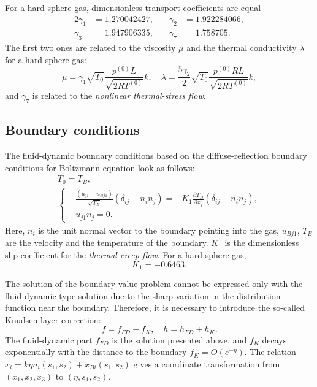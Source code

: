 \documentclass[smallextended, referee]{svjour3} %
\newcommand{\pder}[2][]{\frac{\partial#1}{\partial#2}}
\begin{document}
For a hard-sphere gas, dimensionless transport coefficients are equal
\begin{alignat*}{2}
	\gamma_1 &= 1.270042427, &\quad \gamma_2 &= 1.922284066, \\
	\gamma_3 &= 1.947906335, &\quad \gamma_7 &= 1.758705.
\end{alignat*}
The first two ones are related to the viscosity \(\mu\) and
the thermal conductivity \(\lambda\) for a hard-sphere gas:
\begin{equation}
	\mu = \gamma_1\sqrt{T_0} \frac{p^{(0)}L}{\sqrt{2RT^{(0)}}} k, \quad
	\lambda = \frac{5\gamma_2}{2}\sqrt{T_0} \frac{p^{(0)}RL}{\sqrt{2RT^{(0)}}} k,
\end{equation}	
and \(\gamma_7\) is related to the \emph{nonlinear thermal-stress flow}.

\subsection{Boundary conditions}

The fluid-dynamic boundary conditions based on the diffuse-reflection boundary conditions
for Boltzmann equation look as follows:
\begin{gather}
	T_0 = T_B, \label{eq:bound:T} \\
	\left\{
	\begin{aligned}
		& \frac{(u_{j1}-u_{Bj1})}{\sqrt{T_B}}(\delta_{ij}-n_in_j) = 
			-K_1\pder[T_B]{x_j}(\delta_{ij}-n_in_j), \\
		& u_{j1}n_j = 0.
	\end{aligned}
	\right. \label{eq:bound:v}
\end{gather}
Here, \(n_i\) is the unit normal vector to the boundary pointing into the gas,
\(u_{Bj1}\), \(T_B\) are the velocity and the temperature of the boundary.
\(K_1\) is the dimensionless slip coefficient for the \emph{thermal creep flow}. For a hard-sphere gas,
\[ K_1 = -0.6463. \]

The solution of the boundary-value problem cannot be expressed only with the fluid-dynamic-type
solution due to the sharp variation in the distribution function near the boundary.
Therefore, it is necessary to introduce the so-called Knudsen-layer correction:
\begin{equation}
	f = f_{FD} + f_K, \quad h = h_{FD} + h_K.
\end{equation}
The fluid-dynamic part \(f_{FD}\) is the solution presented above,
and \(f_K\) decays exponentially with the distance to the boundary \(f_K = O\left(e^{-\eta}\right)\).
The relation \( x_i = k\eta n_i(s_1,s_2) + x_{Bi}(s_1, s_2) \) gives a coordinate transformation
from \((x_1,x_2,x_3)\) to \((\eta,s_1,s_2)\).
\end{document}
